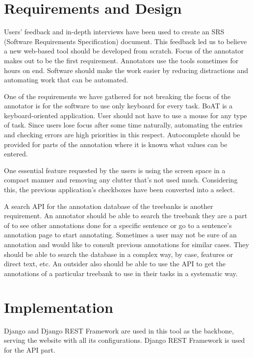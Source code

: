 \documentclass[
]{ceurart}
\begin{document}
\section{Requirements and Design}

Users' feedback and in-depth interviews have been used to create an SRS (Software Requirements Specification) document.
This feedback led us to believe a new web-based tool should be developed from scratch.
Focus of the annotator makes out to be the first requirement.
Annotators use the tools sometimes for hours on end.
Software should make the work easier by reducing distractions and automating work that can be automated.

One of the requirements we have gathered for not breaking the focus of the annotator is for the software to use only keyboard for every task.
BoAT is a keyboard-oriented application.
User should not have to use a mouse for any type of task.
Since users lose focus after some time naturally, automating the entries and checking errors are high priorities in this respect.
Autocomplete should be provided for parts of the annotation where it is known what values can be entered.

One essential feature requested by the users is using the screen space in a compact manner and removing any clutter that's not used much.
Considering this, the previous application's checkboxes have been converted into a select.

A search API for the annotation database of the treebanks is another requirement.
An annotator should be able to search the treebank they are a part of to see other annotations done for a specific sentence or go to a sentence's annotation page to start annotating.
Sometimes a user may not be sure of an annotation and would like to consult previous annotations for similar cases.
They should be able to search the database in a complex way, by case, features or direct text, etc.
An outsider also should be able to use the API to get the annotations of a particular treebank to use in their tasks in a systematic way.

\section{Implementation}

Django\cite{django} and Django REST Framework\cite{drf} are used in this tool as the backbone, serving the website with all its configurations.
Django REST Framework is used for the API part.
\end{document}
